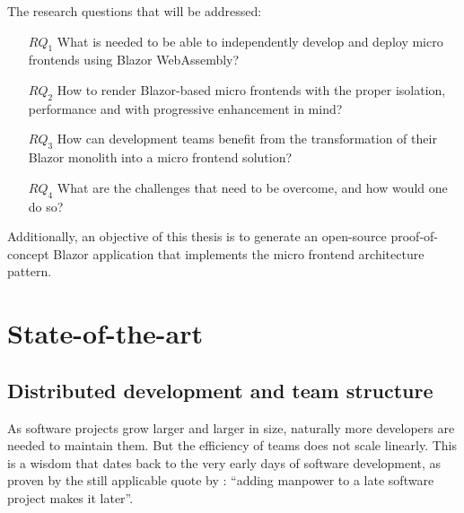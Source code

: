 \begin{minipage}{\linewidth} %
     The research questions that will be addressed:
    \begin{itemize}
        \item[$RQ_1$] What is needed to be able to independently develop and
        deploy micro frontends using Blazor WebAssembly?
        \item[$RQ_2$] How to render Blazor-based micro frontends with the proper
        isolation, performance and with progressive enhancement in mind?
        \item[$RQ_3$] How can development teams benefit from the transformation
        of their Blazor monolith into a micro frontend solution?
        \item[$RQ_4$] What are the challenges that need to be overcome, and how
        would one do so? 
    \end{itemize}
\end{minipage}

\blankline
Additionally, an objective of this thesis is to generate an open-source
proof-of-concept Blazor application that implements the micro frontend
architecture pattern.

\section{State-of-the-art}
\label{sec:state-of-the-art}


\subsection{Distributed development and team structure}
As software projects grow larger and larger in size, naturally more developers
are needed to maintain them. But the efficiency of teams does not scale
linearly. This is a wisdom that dates back to the very early days of software
development, as proven by the still applicable quote by \textcite{Brooks_1975}:
``adding manpower to a late software project makes it later''.

